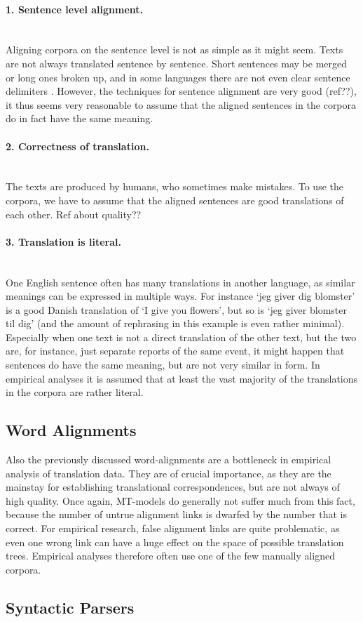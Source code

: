 \documentclass{report}
\newcommand{\myparagraph}[1]{\paragraph{#1}\mbox{}\\}
\theoremstyle{definition}
\theoremstyle{plain}
\begin{document}
\myparagraph{1. Sentence level alignment.}
Aligning corpora on the sentence level is not as simple as it might seem. Texts are not always translated sentence by sentence. Short sentences may be merged or long ones broken up, and in some languages there are not even clear sentence delimiters \citep[p.55]{koehn2008statistical}. However, the techniques for sentence alignment are very good (ref??), it thus seems very reasonable to assume that the aligned sentences in the corpora do in fact have the same meaning.

\myparagraph{2. Correctness of translation. }
The texts are produced by humans, who sometimes make mistakes. To use the corpora, we have to assume that the aligned sentences are good translations of each other. Ref about quality??

\myparagraph{3. Translation is literal.}
One English sentence often has many translations in another language, as similar meanings can be expressed in multiple ways. For instance `jeg giver dig blomster' is a good Danish translation of `I give you flowers', but so is `jeg giver blomster til dig' (and the amount of rephrasing in this example is even rather minimal). Especially when one text is not a direct translation of the other text, but the two are, for instance, just separate reports of the same event, it might happen that sentences do have the same meaning, but are not very similar in form. In empirical analyses it is assumed that at least the vast majority of the translations in the corpora are rather literal.
 
\subsection{Word Alignments}

Also the previously discussed word-alignments are a bottleneck in empirical analysis of translation data. They are of crucial importance, as they are the mainstay for establishing translational correspondences, but are not always of high quality. Once again, MT-models do generally not suffer much from this fact, because the number of untrue alignment links is dwarfed by the number that is correct. For empirical research, false alignment links are quite problematic, as even one wrong link can have a huge effect on the space of possible translation trees. Empirical analyses therefore often use one of the few manually aligned corpora.

\subsection{Syntactic Parsers}
\end{document}
